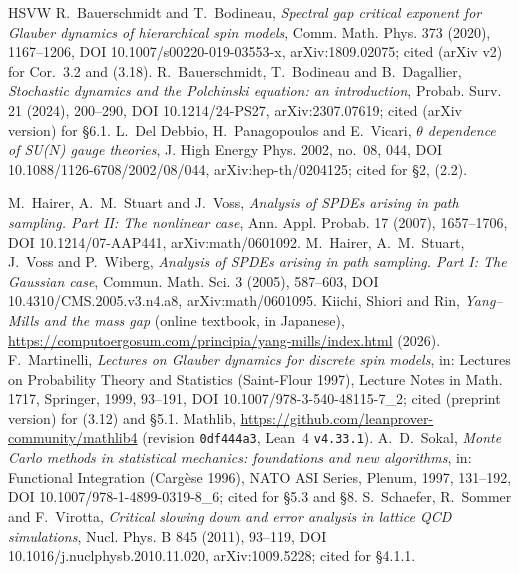 \documentclass[11pt,a4paper]{article}
\theoremstyle{definition}
\theoremstyle{remark}
\newcommand{\code}[1]{\texttt{#1}}
\begin{document}
\begin{thebibliography}{HSVW}
 R.~Bauerschmidt and T.~Bodineau, \emph{Spectral gap critical exponent for Glauber dynamics of hierarchical spin models}, Comm. Math. Phys. 373 (2020), 1167--1206, DOI 10.1007/s00220-019-03553-x, arXiv:1809.02075; cited (arXiv v2) for Cor.~3.2 and (3.18).
 R.~Bauerschmidt, T.~Bodineau and B.~Dagallier, \emph{Stochastic dynamics and the Polchinski equation: an introduction}, Probab. Surv. 21 (2024), 200--290, DOI 10.1214/24-PS27, arXiv:2307.07619; cited (arXiv version) for \S6.1.
 L.~Del Debbio, H.~Panagopoulos and E.~Vicari, \emph{$\theta$ dependence of SU($N$) gauge theories}, J. High Energy Phys. 2002, no.~08, 044, DOI 10.1088/1126-6708/2002/08/044, arXiv:hep-th/0204125; cited for \S2, (2.2).

 M.~Hairer, A.~M.~Stuart and J.~Voss, \emph{Analysis of SPDEs arising in path sampling. Part II: The nonlinear case}, Ann. Appl. Probab. 17 (2007), 1657--1706, DOI 10.1214/07-AAP441, arXiv:math/0601092.
 M.~Hairer, A.~M.~Stuart, J.~Voss and P.~Wiberg, \emph{Analysis of SPDEs arising in path sampling. Part I: The Gaussian case}, Commun. Math. Sci. 3 (2005), 587--603, DOI 10.4310/CMS.2005.v3.n4.a8, arXiv:math/0601095.
 Kiichi, Shiori and Rin, \emph{Yang--Mills and the mass gap} (online textbook, in Japanese), \url{https://computoergosum.com/principia/yang-mills/index.html} (2026).
 F.~Martinelli, \emph{Lectures on Glauber dynamics for discrete spin models}, in: Lectures on Probability Theory and Statistics (Saint-Flour 1997), Lecture Notes in Math. 1717, Springer, 1999, 93--191, DOI 10.1007/978-3-540-48115-7\_2; cited (preprint version) for (3.12) and \S5.1.
 Mathlib, \url{https://github.com/leanprover-community/mathlib4} (revision \code{0df444a3}, Lean~4 \code{v4.33.1}).
 A.~D.~Sokal, \emph{Monte Carlo methods in statistical mechanics: foundations and new algorithms}, in: Functional Integration (Carg\`ese 1996), NATO ASI Series, Plenum, 1997, 131--192, DOI 10.1007/978-1-4899-0319-8\_6; cited for \S5.3 and \S8.
 S.~Schaefer, R.~Sommer and F.~Virotta, \emph{Critical slowing down and error analysis in lattice QCD simulations}, Nucl. Phys. B 845 (2011), 93--119, DOI 10.1016/j.nuclphysb.2010.11.020, arXiv:1009.5228; cited for \S4.1.1.
\end{thebibliography}
\end{document}
